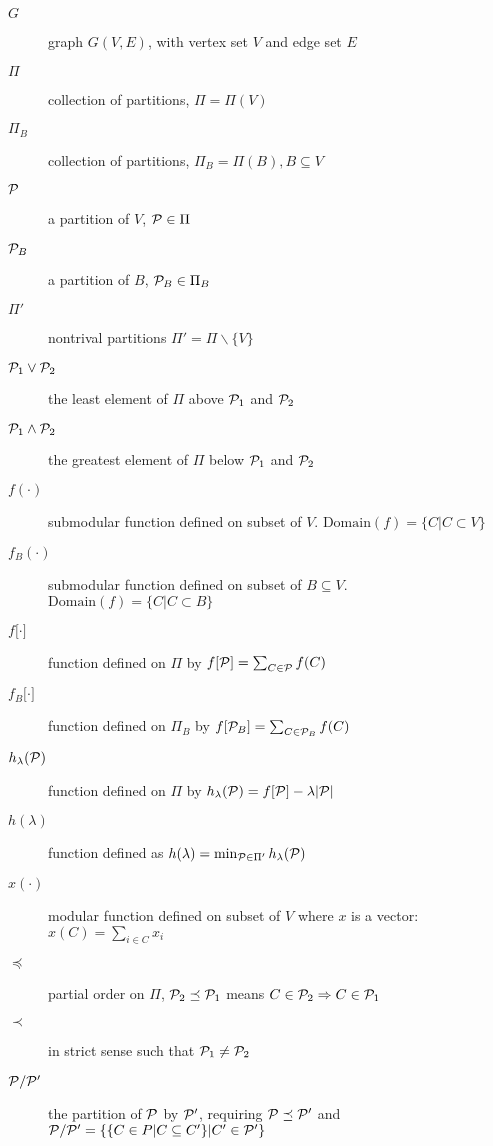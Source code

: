 \begin{description}
\item[$G$] graph $G(V,E)$, with vertex set $V$ and edge set $E$
\item[$\Pi$] collection of partitions, $\Pi = \Pi(V)$
\item[$\Pi_B$] collection of partitions, $\Pi_B = \Pi(B), B\subseteq V$
\item[$\P$] a partition of $V$, $\P \in \Pi$
\item[$\P_B$] a partition of $B$, $\P_B \in \Pi_B$
\item[$\Pi'$] nontrival partitions $\Pi' = \Pi \backslash \{V\}$
\item[$\P_1 \vee \P_2$] the least element of $\Pi$ above $\P_1$ and $\P_2$
\item[$\P_1 \wedge \P_2$] the greatest element of $\Pi$ below $\P_1$ and $\P_2$
\item[$f(\cdot)$] submodular function defined on subset of $V$. $\mathrm{Domain}(f)=\{C| C\subset V\}$
\item[$f_B(\cdot)$] submodular function defined on subset of $B\subseteq V$. $\mathrm{Domain}(f)=\{C| C\subset B\}$
\item[$f{[}\cdot{]}$] function defined on $\Pi$ by $f[\P] = \sum_{C\in \P} f(C)$
\item[$f_B{[}\cdot{]}$] function defined on $\Pi_B$ by $f[\P_B] = \sum_{C\in \P_B} f(C)$
\item[$h_{\lambda}(\P)$] function defined on $\Pi$ by $h_{\lambda}(\P)=f[\P]-\lambda\abs{\P}$
\item[$h(\lambda)$] function defined as $ h(\lambda) = \min_{\P \in \Pi'} h_{\lambda}(\P)$
\item[$x(\cdot)$] modular function defined on subset of $V$ where $x$ is a vector: $x(C)=\sum_{i \in C} x_i$
\item[$\preceq$] partial order on $\Pi$, $\P_2 \preceq \P_1$ means $C\in \P_2 \Rightarrow C \in \P_1$
\item[$\prec$] in strict sense such that $\P_1 \neq \P_2 $
\item[$\P/\P'$] the partition of $\P$ by $\P'$, requiring $\P\preceq \P'$ and $\P/\P'=\{\{ C \in P | C \subseteq C' \} | C' \in \P'\}$
\end{description}

